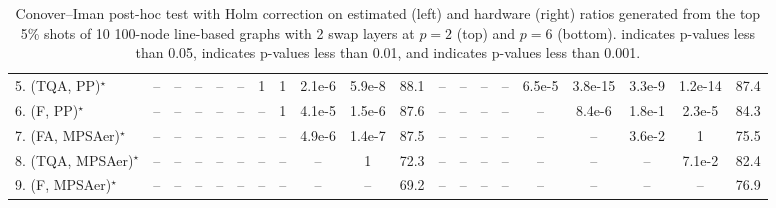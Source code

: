 \begin{table}[ht]
{\begin{tabular}{l|cccccccccc|ccccccccc|}
5. (TQA, PP)$^\star$ & -- & -- & -- & -- & -- & 1 & 1 & {\cellcolor[HTML]{00441B}} \color[HTML]{F1F1F1} 2.1e-6 & {\cellcolor[HTML]{00441B}} \color[HTML]{F1F1F1} 5.9e-8 & 88.1 & -- & -- & -- & -- & {\cellcolor[HTML]{00441B}} \color[HTML]{F1F1F1} 6.5e-5 & {\cellcolor[HTML]{00441B}} \color[HTML]{F1F1F1} 3.8e-15 & {\cellcolor[HTML]{00441B}} \color[HTML]{F1F1F1} 3.3e-9 & {\cellcolor[HTML]{00441B}} \color[HTML]{F1F1F1} 1.2e-14 & 87.4 \\
6. (F, PP)$^\star$ & -- & -- & -- & -- & -- & -- & 1 & {\cellcolor[HTML]{00441B}} \color[HTML]{F1F1F1} 4.1e-5 & {\cellcolor[HTML]{00441B}} \color[HTML]{F1F1F1} 1.5e-6 & 87.6 & -- & -- & -- & -- & -- & {\cellcolor[HTML]{00441B}} \color[HTML]{F1F1F1} 8.4e-6 & 1.8e-1 & {\cellcolor[HTML]{00441B}} \color[HTML]{F1F1F1} 2.3e-5 & 84.3 \\
7. (FA, MPSAer)$^\star$ & -- & -- & -- & -- & -- & -- & -- & {\cellcolor[HTML]{00441B}} \color[HTML]{F1F1F1} 4.9e-6 & {\cellcolor[HTML]{00441B}} \color[HTML]{F1F1F1} 1.4e-7 & 87.5 & -- & -- & -- & -- & -- & -- & {\cellcolor[HTML]{B5E1AE}} \color[HTML]{000000} 3.6e-2 & 1 & 75.5 \\
8. (TQA, MPSAer)$^\star$ & -- & -- & -- & -- & -- & -- & -- & -- & 1 & 72.3 & -- & -- & -- & -- & -- & -- & -- & 7.1e-2 & 82.4 \\
9. (F, MPSAer)$^\star$ & -- & -- & -- & -- & -- & -- & -- & -- & -- & 69.2 & -- & -- & -- & -- & -- & -- & -- & -- & 76.9 \\
\hline

\end{tabular}
}
\caption{Conover–Iman post-hoc test with Holm correction on estimated (left) and hardware (right) ratios generated from the top 5\% shots of 10 100-node line-based graphs with 2 swap layers at $p=2$ (top) and $p=6$ (bottom).  indicates p-values less than 0.05,  indicates p-values less than 0.01, and  indicates p-values less than 0.001.}
\label{tab:N100L2S2_2_6_5pc_hw}
\end{table}